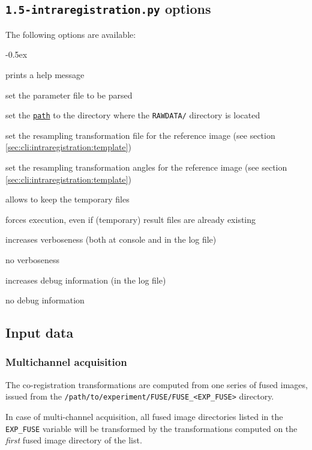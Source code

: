 \subsection{\texttt{1.5-intraregistration.py} options}

The following options are available:
\begin{description}
  \itemsep -0.5ex
\item[\texttt{-h}] prints a help message
\item[\texttt{-p \underline{file}}] set the parameter file to be parsed
\item[\texttt{-e \underline{path}}] set the
  \texttt{\underline{path}} to the directory where the
  \texttt{RAWDATA/} directory is located
\item[\texttt{-t \underline{file}}] set the resampling transformation file for the reference image (see section \ref{sec:cli:intraregistration:template})
\item[\texttt{-a \underline{string}}] set the resampling transformation angles for the reference image (see section \ref{sec:cli:intraregistration:template})
\item[\texttt{-k}] allows to keep the temporary files
\item[\texttt{-f}] forces execution, even if (temporary) result files
  are already existing
\item[\texttt{-v}] increases verboseness (both at console and in the
  log file)
\item[\texttt{-nv}] no verboseness
\item[\texttt{-d}]  increases debug information (in the
  log file)
\item[\texttt{-nd}] no debug information
\end{description}

\subsection{Input data}
\subsubsection{Multichannel acquisition}

The co-registration transformations are computed from one series of fused images, issued from the \texttt{/path/to/experiment/FUSE/FUSE\_<EXP\_FUSE>} directory.

In case of multi-channel acquisition, all fused image directories  listed in the \texttt{EXP\_FUSE} variable will be transformed by the transformations computed on the \textit{first} fused image directory of the list.

